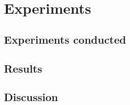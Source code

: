 \section{Experiments} \label{rb:sec:experiments}

\subsection{Experiments conducted} \label{rb:subsec:experiments}

\subsection{Results} \label{rb:subsec:results}

\subsection{Discussion} \label{rb:subsec:discuss}




